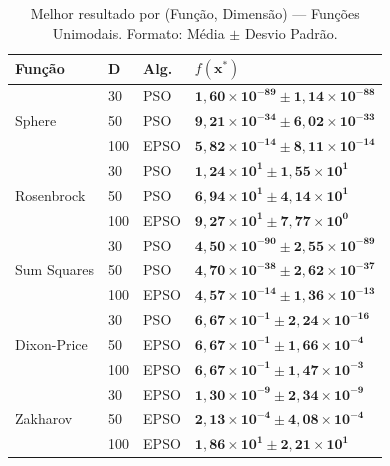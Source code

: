 \documentclass[runningheads]{llncs}
\begin{document}
\begin{table}[H]
\caption{Melhor resultado por (Função, Dimensão) — Funções Unimodais.
Formato: Média $\pm$ Desvio Padrão.}
\label{tab:unimodais}
\centering
\scriptsize
\begin{tabular}{llll}
\toprule
\textbf{Função} & \textbf{D} & \textbf{Alg.} & $f(\mathbf{x}^*)$ \\
\midrule
\multirow{3}{*}{Sphere}
  & 30  & PSO  & $\mathbf{1{,}60 \times 10^{-89} \pm 1{,}14 \times 10^{-88}}$ \\
  & 50  & PSO  & $\mathbf{9{,}21 \times 10^{-34} \pm 6{,}02 \times 10^{-33}}$ \\
  & 100 & EPSO & $\mathbf{5{,}82 \times 10^{-14} \pm 8{,}11 \times 10^{-14}}$ \\
\midrule
\multirow{3}{*}{Rosenbrock}
  & 30  & PSO  & $\mathbf{1{,}24 \times 10^{1} \pm 1{,}55 \times 10^{1}}$ \\
  & 50  & PSO  & $\mathbf{6{,}94 \times 10^{1} \pm 4{,}14 \times 10^{1}}$ \\
  & 100 & EPSO & $\mathbf{9{,}27 \times 10^{1} \pm 7{,}77 \times 10^{0}}$ \\
\midrule
\multirow{3}{*}{Sum Squares}
  & 30  & PSO  & $\mathbf{4{,}50 \times 10^{-90} \pm 2{,}55 \times 10^{-89}}$ \\
  & 50  & PSO  & $\mathbf{4{,}70 \times 10^{-38} \pm 2{,}62 \times 10^{-37}}$ \\
  & 100 & EPSO & $\mathbf{4{,}57 \times 10^{-14} \pm 1{,}36 \times 10^{-13}}$ \\
\midrule
\multirow{3}{*}{Dixon-Price}
  & 30  & PSO  & $\mathbf{6{,}67 \times 10^{-1} \pm 2{,}24 \times 10^{-16}}$ \\
  & 50  & EPSO & $\mathbf{6{,}67 \times 10^{-1} \pm 1{,}66 \times 10^{-4}}$ \\
  & 100 & EPSO & $\mathbf{6{,}67 \times 10^{-1} \pm 1{,}47 \times 10^{-3}}$ \\
\midrule
\multirow{3}{*}{Zakharov}
  & 30  & EPSO & $\mathbf{1{,}30 \times 10^{-9} \pm 2{,}34 \times 10^{-9}}$ \\
  & 50  & EPSO & $\mathbf{2{,}13 \times 10^{-4} \pm 4{,}08 \times 10^{-4}}$ \\
  & 100 & EPSO & $\mathbf{1{,}86 \times 10^{1} \pm 2{,}21 \times 10^{1}}$ \\
\bottomrule
\end{tabular}
\end{table}
\end{document}
